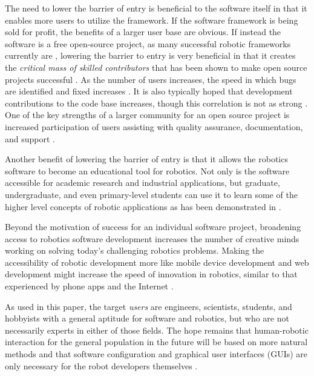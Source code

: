 \documentclass[10pt,journal,compsoc]{joser1}
\begin{document}
{The need to lower the barrier of entry is beneficial to the software itself in that it enables more users to utilize the framework. If the software framework is being sold for profit, the benefits of a larger user base are obvious. If instead the software is a free open-source project, as many successful robotic frameworks currently are \cite{makarenko2007benefits}, lowering the barrier to entry is very beneficial in that it creates the \textit{critical mass of skilled contributors} that has been shown to make open source projects successful \cite{bruyninckx2001open}. As the number of users increases, the speed in which bugs are identified and fixed increases \cite{schmidt1999software}. It is also typically hoped that development contributions to the code base increases, though this correlation is not as strong \cite{schmidt1999software}. One of the key strengths of a larger community for an open source project is increased participation of users assisting with quality assurance, documentation, and support 
\cite{schmidt2001leveraging}.

Another benefit of lowering the barrier of entry is that it allows the robotics software to become an educational tool for robotics. Not only is the software accessible for academic research and industrial applications, but graduate, undergraduate, and even primary-level students can use it to learn some of the higher level concepts of robotic applications as has been demonstrated in \cite{correll2013one, moll2011teaching, guyot2011teaching}. 

Beyond the motivation of success for an individual software project, broadening access to robotics software development increases the number of creative minds working on solving today's challenging robotics problems. Making the accessibility of robotic development more like mobile device development and web development might increase the speed of innovation in robotics, similar to that experienced by phone apps and the Internet \cite{boudreau2012let}.

As used in this paper, the target \textit{users} are engineers, scientists, students, and hobbyists with a general aptitude for software and robotics, but who are not necessarily experts in either of those fields. The hope remains that human-robotic interaction for the general population in the future will be based on more natural methods and that software configuration and graphical user interfaces (GUIs) are only necessary for the robot developers themselves \cite{yancotaxonomy}.

}
\end{document}
